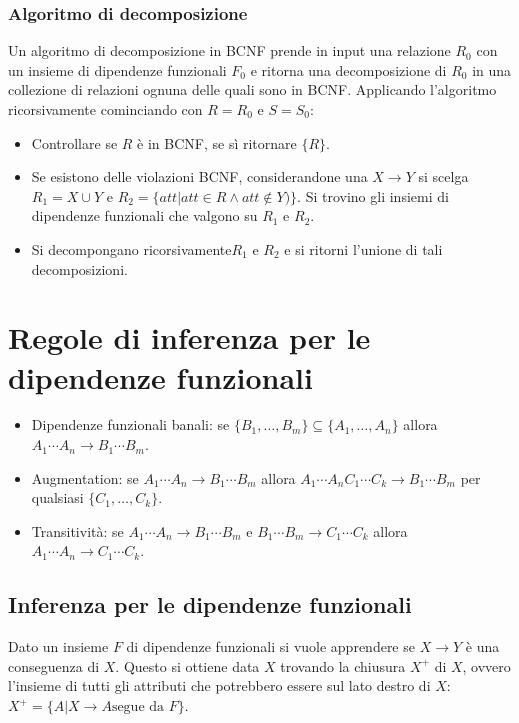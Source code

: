 \subsubsection{Algoritmo di decomposizione}
Un algoritmo di decomposizione in BCNF prende in input una relazione $R_0$ con un insieme di dipendenze funzionali $F_0$ e ritorna una decomposizione di $R_0$ in una collezione di relazioni ognuna delle
quali sono in BCNF. Applicando l'algoritmo ricorsivamente cominciando con $R=R_0$ e $S=S_0$:
\begin{itemize}
\item Controllare se $R$ \`e in BCNF, se s\`i ritornare $\{R\}$.
\item Se esistono delle violazioni BCNF, considerandone una $X\rightarrow Y$ si scelga $R_1=X\cup Y$ e $R_2=\{att|att\in R\land att\not\in Y)\}$. Si trovino gli insiemi di dipendenze funzionali che valgono su 
$R_1$ e $R_2$.
\item Si decompongano ricorsivamente$R_1$ e $R_2$ e si ritorni l'unione di tali decomposizioni.
\end{itemize}
\section{Regole di inferenza per le dipendenze funzionali}
\begin{itemize}
\item Dipendenze funzionali banali: se $\{B_1, \dots, B_m\}\subseteq\{A_1, \dots, A_n\}$ allora $A_1\cdots A_n\rightarrow B_1\cdots B_m$.
\item Augmentation: se $A_1\cdots A_n\rightarrow B_1\cdots B_m$ allora $A_1\cdots A_nC_1\cdots C_k\rightarrow B_1\cdots B_m$ per qualsiasi $\{C_1,\dots, C_k\}$.
\item Transitivit\`a: se $A_1\cdots A_n\rightarrow B_1\cdots B_m$ e $B_1\cdots B_m\rightarrow C_1\cdots C_k$ allora $A_1\cdots A_n\rightarrow C_1\cdots C_k$. 
\end{itemize}
\subsection{Inferenza per le dipendenze funzionali}
Dato un insieme $F$ di dipendenze funzionali si vuole apprendere se $X\rightarrow Y$ \`e una conseguenza di $X$. Questo si ottiene data $X$ trovando la chiusura $X^+$ di $X$, ovvero l'insieme di tutti gli 
attributi che potrebbero essere sul lato destro di $X$: $X^+=\{A|X\rightarrow A\text{segue da } F\}$.
